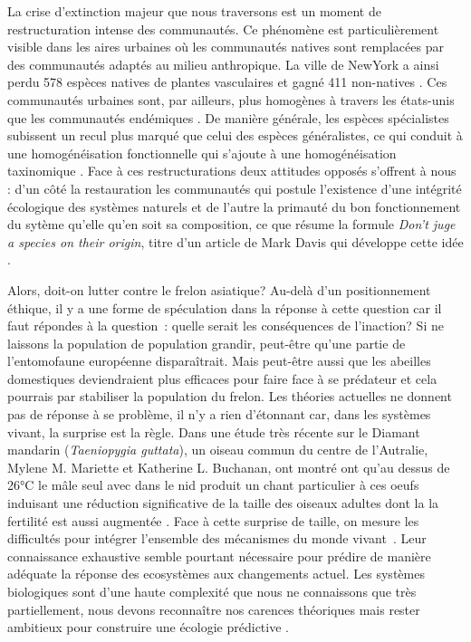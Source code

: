 La crise d'extinction majeur que nous traversons \citep{Thomas2004} est
un moment de restructuration intense des communautés. Ce phénomène est
particulièrement visible dans les aires urbaines où les communautés
natives sont remplacées par des communautés adaptés au milieu
anthropique. La ville de NewYork a ainsi perdu 578 espèces natives de
plantes vasculaires et gagné 411 non-natives \citep{McKinney2006}. Ces
communautés urbaines sont, par ailleurs, plus homogènes à travers les
états-unis que les communautés endémiques \citep{McKinney2006}. De
manière générale, les espèces spécialistes subissent un recul plus
marqué que celui des espèces généralistes, ce qui conduit à une
homogénéisation fonctionnelle qui s'ajoute à une homogénéisation
taxinomique \citep{Clavel2011}. Face à ces restructurations deux
attitudes opposés s'offrent à nous : d'un côté la restauration les
communautés qui postule l'existence d'une intégrité écologique des
systèmes naturels \citep{Suding2015} et de l'autre la primauté du bon
fonctionnement du sytème qu'elle qu'en soit sa composition, ce que
résume la formule \emph{Don't juge a species on their origin}, titre
d'un article de Mark Davis qui développe cette idée \citep{Davis2011}.

Alors, doit-on lutter contre le frelon asiatique? Au-delà d'un
positionnement éthique, il y a une forme de spéculation dans la réponse
à cette question car il faut répondes à la question~: quelle serait les
conséquences de l'inaction? Si ne laissons la population de population
grandir, peut-être qu'une partie de l'entomofaune européenne
disparaîtrait. Mais peut-être aussi que les abeilles domestiques
deviendraient plus efficaces pour faire face à se prédateur et cela
pourrais par stabiliser la population du frelon. Les théories actuelles
ne donnent pas de réponse à se problème, il n'y a rien d'étonnant car,
dans les systèmes vivant, la surprise est la règle. Dans une étude très
récente sur le Diamant mandarin (\emph{Taeniopygia guttata}), un oiseau
commun du centre de l'Autralie, Mylene M. Mariette et Katherine L.
Buchanan, ont montré ont qu'au dessus de 26°C le mâle seul avec dans le
nid produit un chant particulier à ces oeufs induisant une réduction
significative de la taille des oiseaux adultes dont la la fertilité est
aussi augmentée \citep{Mariette2016}. Face à cette surprise de taille,
on mesure les difficultés pour intégrer l'ensemble des mécanismes du
monde vivant~. Leur connaissance exhaustive semble pourtant nécessaire
pour prédire de manière adéquate la réponse des ecosystèmes aux
changements actuel. Les systèmes biologiques sont d'une haute complexité
que nous ne connaissons que très partiellement, nous devons reconnaître
nos carences théoriques mais rester ambitieux pour construire une
écologie prédictive \citep{Mouquet2015}.

